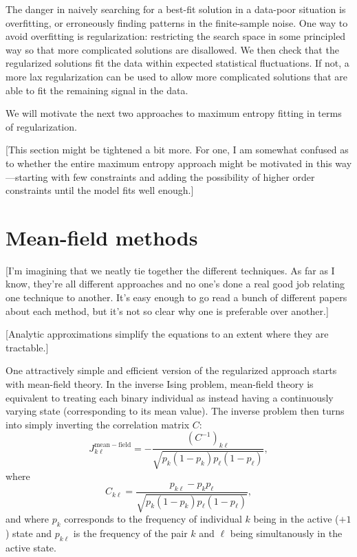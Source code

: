 \documentclass[aps,prl,twocolumn]{revtex4-1}
\begin{document}
The danger in naively searching for a best-fit solution in a data-poor situation
is overfitting, or erroneously finding patterns in the finite-sample noise.
One way to avoid overfitting is regularization:
restricting the search space in some principled way so that more complicated
solutions are disallowed.  We then check that the regularized solutions fit the
data within expected statistical fluctuations.  If not, a more lax regularization
can be used to allow more complicated solutions that are able to fit the
remaining signal in the data.

We will motivate the next two approaches to maximum entropy fitting in terms
of regularization.

[This section might be tightened a bit more.  For one, I am somewhat confused as
to whether the entire maximum entropy approach might be motivated in this
way---starting with few constraints and adding the possibility of higher order
constraints until the model fits well enough.]


\section{Mean-field methods}
[I'm imagining that we neatly tie together the different techniques. As far as I know, they're all different approaches and no one's done a real good job relating one technique to another. It's easy enough to go read a bunch of different papers about each method, but it's not so clear why one is preferable over another.]

[Analytic approximations simplify the equations to an extent where they are tractable.]

One attractively simple and efficient version of the regularized approach starts
with mean-field theory.  In the inverse Ising problem, mean-field theory is equivalent
to treating each binary individual as instead having a continuously varying state
(corresponding to its mean value).  The inverse problem then turns into simply inverting
the correlation matrix $C$: \cite{CocMon12}
\begin{equation}
\label{meanFieldSolution}
J^{\mathrm{mean-field}}_{k\ell} =
    - \frac{ (C^{-1})_{k\ell} }{ \sqrt{p_k(1-p_k)p_\ell(1-p_\ell)} },
\end{equation}
where
\begin{equation}
C_{k\ell} = \frac{ p_{k\ell} - p_k p_\ell }{ \sqrt{p_k(1-p_k)p_\ell(1-p_\ell)} },
\end{equation}
and where $p_k$ corresponds to the frequency of individual $k$ being
in the active ($+1$) state and $p_{k\ell}$ is the frequency of the pair
$k$ and $\ell$ being simultanously in the active state.
\end{document}
